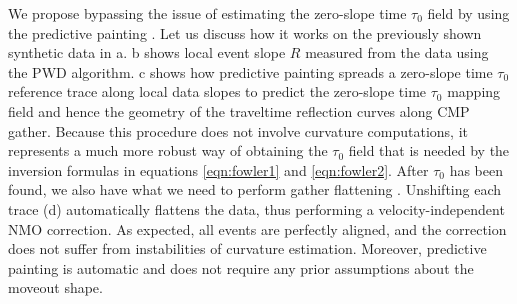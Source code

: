 We propose bypassing the issue of estimating the zero-slope time $\tau
_{0}$ field by using the predictive painting 
. Let us discuss how it works on the previously shown
synthetic data in a.
b shows local event slope $R$ measured from the data
using the PWD algorithm. c shows how predictive
painting spreads a zero-slope time $\tau _{0}$ reference trace along
local data slopes to predict the zero-slope time $\tau _{0}$ mapping
field and hence the geometry of the traveltime reflection curves along
\taup CMP gather. Because this procedure does not involve curvature
computations, it represents a much more robust way of obtaining the
$\tau _{0}$ field that is needed by the inversion formulas in
equations \ref{eqn:fowler1} and \ref{eqn:fowler2}. After $\tau _{0}$
has been found, we also have what we need to perform gather flattening
\citep{burnett:WB129,burnett:3710}.
Unshifting each trace (d) automatically flattens the
data, thus performing a velocity-independent \taup NMO correction. As
expected, all events are perfectly aligned, and the correction does
not suffer from instabilities of curvature estimation.  Moreover,
predictive painting is automatic and does not require any prior
assumptions about the moveout shape.


